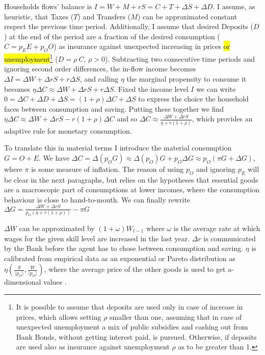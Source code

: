 \documentclass[a4paper, headings=standardclasses]{scrartcl}
\begin{document}
Households flows' balance is $I = W + M + rS = C + T + \Delta S + \Delta D$.
I assume, as heuristic, that Taxes ($T$) and Transfers ($M$) can be approximated constant respect the previous time period.
Additionally, I assume that desired Deposits ($D$) at the end of the period are a fraction of the desired consumption ($C = p_E E + p_O O$) as insurance against unexpected increasing in prices \hl{or unemployment}\footnote{It is possible to assume that deposits are used only in case of increase in prices, which allows setting $\rho$ smaller than one, assuming that in case of unexpected unemployment a mix of public subsidies and cashing out from Bank Bonds, without getting interest paid, is pursued. Otherwise, if deposits are used also as insurance against unemployment $\rho$ as to be greater than 1.} ($D = \rho~C$, $\rho > 0$).
Subtracting two consecutive time periods and ignoring second order differences, the in-flow income becomes $\Delta I = \Delta W + \Delta r S + r \Delta S$, and calling $\eta$ the marginal propensity to consume it becomes $\eta \Delta C \approx \Delta W + \Delta r S + r \Delta S$.
Fixed the income level $I$ we can write $0 = \Delta C + \Delta D + \Delta S = (1+\rho) \Delta C + \Delta S$ to express the choice the household faces between consumption and saving.
Putting these together we find $\eta \Delta C \approx \Delta W + \Delta r S - r (1+\rho) \Delta C$ and so $\Delta C \approx \frac{\Delta W + \Delta r S}{\eta + r (1+\rho)}$, which provides an adaptive rule for monetary consumption.

To translate this in material terms I introduce the material consumption $G = O + E$. We have $\Delta C = \Delta (p_O G) \approx \Delta(p_O) G + p_O \Delta G \approx p_O (\pi G + \Delta G)$, where $\pi$ is some measure of inflation. The reason of using $p_O$ and ignoring $p_E$ will be clear in the next paragraphs, but relies on the hypotheses that essential goods are a macroscopic part of consumptions at lower incomes, where the consumption behaviour is close to hand-to-mouth. We can finally rewrite $\Delta G = \frac{\Delta W + \Delta r S}{p_O(\eta + r (1+\rho))} - \pi G$

$\Delta W$ can be approximated by $(1 + \omega) W_{t-1}$ where $\omega$ is the average rate at which wages for the given skill level are increased in the last year. $\Delta r$ is communicated by the Bank before the agent has to chose between consumption and saving. $\eta$ is calibrated from empirical data as an exponential or Pareto distribution as $\eta(\frac{S}{\langle p_O \rangle},\frac{W}{\langle p_O \rangle})$, where the average price of the other goods is used to get a-dimensional values \parencite{fisher2020,carroll2017}.
\end{document}
